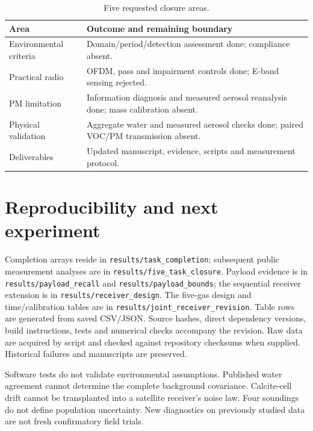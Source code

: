 \documentclass[conference]{IEEEtran}
\begin{document}
\begin{table}[t]\centering\footnotesize
\caption{Five requested closure areas.}
\begin{tabular}{p{}p{}}\toprule
Area & Outcome and remaining boundary\\\midrule
Environmental criteria & Domain/period/detection assessment done; compliance absent.\\
Practical radio & OFDM, pass and impairment controls done; E-band sensing rejected.\\
PM limitation & Information diagnosis and measured aerosol reanalysis done; mass calibration absent.\\
Physical validation & Aggregate water and measured aerosol checks done; paired VOC/PM transmission absent.\\
Deliverables & Updated manuscript, evidence, scripts and measurement protocol.\\\bottomrule
\end{tabular}
\end{table}







\section{Reproducibility and next experiment}
Completion arrays reside in \texttt{results/task\_completion}; subsequent public measurement analyses are in \texttt{results/five\_task\_closure}. Payload evidence is in \texttt{results/payload\_recall} and \texttt{results/payload\_bounds}; the sequential receiver extension is in \texttt{results/receiver\_design}. The five-gas design and time/calibration tables are in \texttt{results/joint\_receiver\_revision}. Table rows are generated from saved CSV/JSON. Source hashes, direct dependency versions, build instructions, tests and numerical checks accompany the revision. Raw data are acquired by script and checked against repository checksums when supplied. Historical failures and manuscripts are preserved.

Software tests do not validate environmental assumptions. Published water agreement cannot determine the complete background covariance. Calcite-cell drift cannot be transplanted into a satellite receiver's noise law. Four soundings do not define population uncertainty. New diagnostics on previously studied data are not fresh confirmatory field trials.
\end{document}
